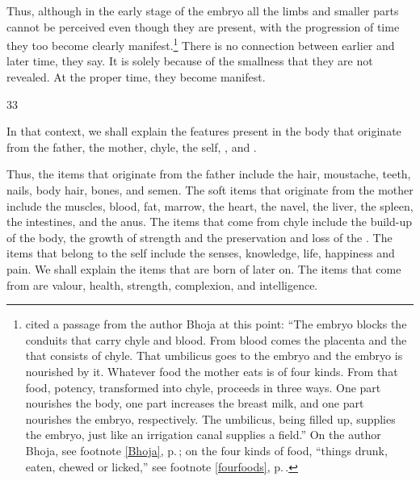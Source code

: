 \begin{translation}
    Thus, although in the early stage of the embryo all the limbs and
smaller parts cannot be perceived even though they are present,
with the progression of time they too become clearly
manifest.\footnote{ cited a passage from the
    author Bhoja at this point:  “The embryo blocks
    the conduits that carry chyle and blood. From blood comes the
    placenta and the  that consists of chyle. That
    umbilicus goes to the embryo and the embryo is nourished by it.
    Whatever food the mother eats is of four kinds. From that food,
    potency, transformed into chyle, proceeds in three ways.  One part
    nourishes the body, one part increases the breast milk, and one
    part nourishes the embryo, respectively.  The umbilicus, being
    filled up, supplies the embryo, just like an irrigation canal
    supplies a field.” On the author Bhoja, see footnote \ref{Bhoja},
    p.\,\pageref{Bhoja}; on the four kinds of food,  “things drunk,
    eaten, chewed or licked,” see footnote \ref{fourfoods},
    p.\,\pageref{fourfoods}.}
%
There is no connection between earlier and later time, they say.  It is solely 
because of the smallness that they are not revealed.  At the proper time, they 
become manifest.

\item[33]

In that context, we shall explain the features present in the body that originate 
from the father, the mother, chyle, the self, , and 
.

Thus, the items that originate from the father include the hair, 
moustache, teeth, nails, body hair, bones, and semen.  The soft items that 
originate from the mother include the muscles, blood, fat, marrow, the heart, 
the navel, the liver, the spleen, the intestines, and the anus.  
%
The items that come
from chyle include the build-up of the body, the growth of strength and the 
preservation and loss of the . 
%
The items that belong to the self include
the senses, knowledge, life, happiness and pain.  
%
We shall explain the items that are born of   later on. 
%
The items that come from  are
valour, health, strength, complexion, and intelligence.


\end{translation}
